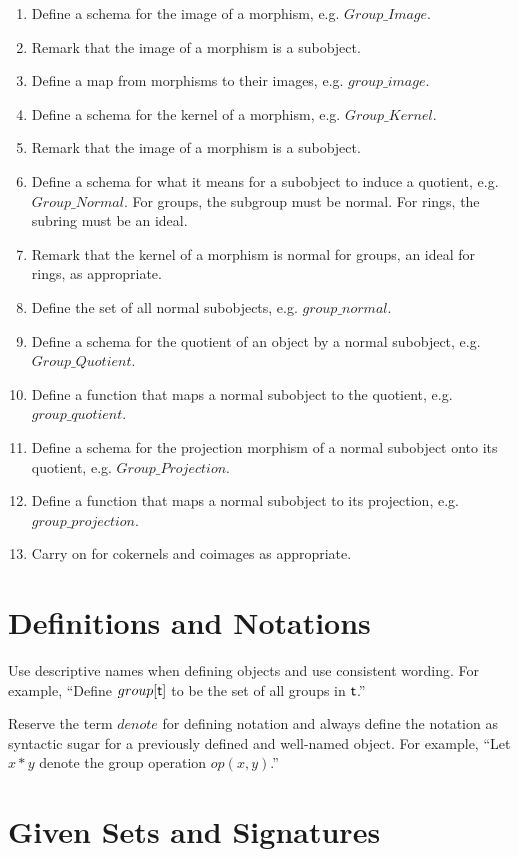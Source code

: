 \documentclass{amsart}
\begin{document}
\begin{enumerate}
	\item Define a schema for the image of a morphism, e.g. $Group\_Image$.
	\item Remark that the image of a morphism is a subobject.
	\item Define a map from morphisms to their images, e.g. $group\_image$.
	\item Define a schema for the kernel of a morphism, e.g. $Group\_Kernel$.
	\item Remark that the image of a morphism is a subobject.
	\item Define a schema for what it means for a subobject to induce a quotient, e.g. $Group\_Normal$.
	For groups, the subgroup must be normal. For rings, the subring must be an ideal.
	\item Remark that the kernel of a morphism is normal for groups, an ideal for rings, as appropriate.
	\item Define the set of all normal subobjects, e.g. $group\_normal$.
	\item Define a schema for the quotient of an object by a normal subobject, e.g. $Group\_Quotient$.
	\item Define a function that maps a normal subobject to the quotient, e.g. $group\_quotient$.
	\item Define a schema for the projection morphism of a normal subobject onto its quotient, 
	e.g. $Group\_Projection$.
	\item Define a function that maps a normal subobject to its projection, e.g. $group\_projection$.
	\item Carry on for cokernels and coimages as appropriate.
\end{enumerate}


\section{Definitions and Notations}

Use descriptive names when defining objects and use consistent wording.
For example, ``Define $group[\mathsf{t}]$ to be the set of all groups in $\mathsf{t}$.''

Reserve the term $denote$ for defining notation and always define the notation
as syntactic sugar for a previously defined and well-named object.
For example, ``Let $x * y$ denote the group operation $op(x,y)$.''

\section{Given Sets and Signatures}
\end{document}
